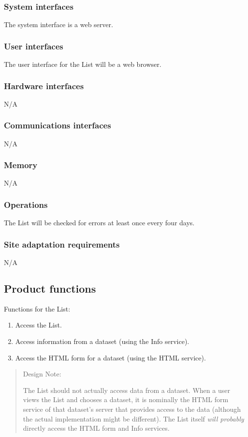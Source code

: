 \documentclass{article}
\begin{document}
\subsubsection{System interfaces}
The system interface is a web server.

\subsubsection{User interfaces}
The user interface for the List will be a web browser.

\subsubsection{Hardware interfaces}
N/A

\subsubsection{Communications interfaces}
N/A

\subsubsection{Memory}
N/A

\subsubsection{Operations}
The List will be checked for errors at least once every four days.

\subsubsection{Site adaptation requirements}
N/A

\subsection{Product functions}
Functions for the List:
\begin{enumerate}
\item Access the List.
\item Access information from a dataset (using the Info service).
\item Access the HTML form for a dataset (using the HTML service).
\end{enumerate}

\begin{quote}
Design Note:

The List should not actually access data from a dataset. When a user views
the List and chooses a dataset, it is nominally the HTML form service of that
dataset's server that provides access to the data (although the actual
implementation might be different). The List itself \emph{will probably}
directly access the HTML form and Info services.
\end{quote}
\end{document}
